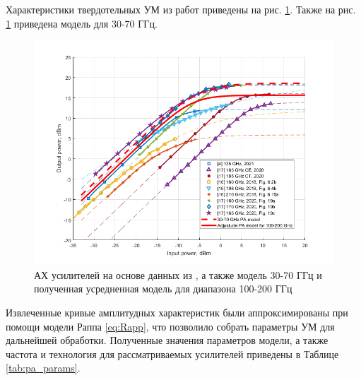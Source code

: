 Характеристики твердотельных УМ из работ
\cite{zhang2021}\cite{amadorey2018}\cite{aliyun2020} приведены на рис.
\ref{fig:pa_research_mean}. Также на рис. \ref{fig:pa_research_mean}
приведена модель для 30-70 ГГц.
\begin{figure}[h]
    \centering
    \includegraphics[width=0.9\linewidth]{figs/pa100mean.png}
    \caption{АХ усилителей на основе данных из
    \cite{zhang2021}\cite{amadorey2018}\cite{aliyun2020}, а также
    модель 30-70 ГГц \cite{nokia163314} и полученная усредненная модель
    для диапазона 100-200 ГГц}
    \label{fig:pa_research_mean}
\end{figure}

Извлеченные кривые амплитудных характеристик были аппроксимированы при
помощи модели Раппа \ref{eq:Rapp}, что позволило собрать параметры УМ для
дальнейшей обработки. Полученные значения параметров модели, а также
частота и технология для рассматриваемых усилителей приведены в Таблице
\ref{tab:pa_params}. 

